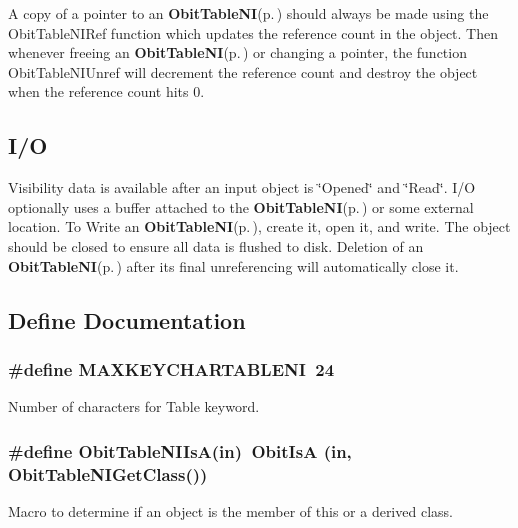 A copy of a pointer to an {\bf Obit\-Table\-NI}{\rm (p.\,\pageref{structObitTableNI})} should always be made using the Obit\-Table\-NIRef function which updates the reference count in the object. Then whenever freeing an {\bf Obit\-Table\-NI}{\rm (p.\,\pageref{structObitTableNI})} or changing a pointer, the function Obit\-Table\-NIUnref will decrement the reference count and destroy the object when the reference count hits 0.\subsection{I/O}\label{ObitTableNI_8h_ObitTableNIUsage}
Visibility data is available after an input object is \char`\"{}Opened\char`\"{} and \char`\"{}Read\char`\"{}. I/O optionally uses a buffer attached to the {\bf Obit\-Table\-NI}{\rm (p.\,\pageref{structObitTableNI})} or some external location. To Write an {\bf Obit\-Table\-NI}{\rm (p.\,\pageref{structObitTableNI})}, create it, open it, and write. The object should be closed to ensure all data is flushed to disk. Deletion of an {\bf Obit\-Table\-NI}{\rm (p.\,\pageref{structObitTableNI})} after its final unreferencing will automatically close it.

\subsection{Define Documentation}
\subsubsection{\setlength{\rightskip}{0pt plus 5cm}\#define MAXKEYCHARTABLENI\ 24}\label{ObitTableNI_8h_a0}


Number of characters for Table keyword. 

\subsubsection{\setlength{\rightskip}{0pt plus 5cm}\#define Obit\-Table\-NIIs\-A(in)\ Obit\-Is\-A (in, Obit\-Table\-NIGet\-Class())}\label{ObitTableNI_8h_a3}


Macro to determine if an object is the member of this or a derived class. 


